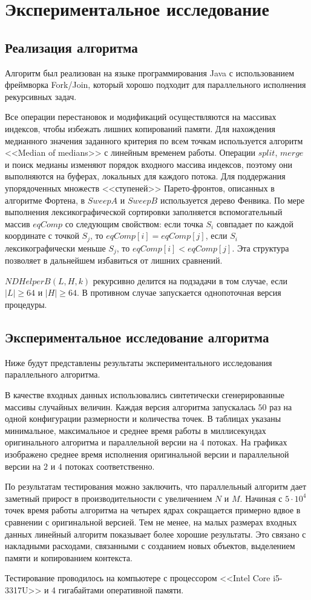 \chapter{Экспериментальное исследование}
\section{Реализация алгоритма}
Алгоритм был реализован на языке программирования Java с использованием фреймворка Fork/Join, который хорошо подходит для параллельного исполнения рекурсивных задач.

Все операции перестановок и модификаций осуществляются на массивах индексов, чтобы избежать лишних копирований памяти.
Для нахождения медианного значения заданного критерия по всем точкам используется алгоритм <<Median of medians>> с линейным временем работы.
Операции $split$, $merge$ и поиск медианы изменяют порядок входного массива индексов, поэтому они выполняются на буферах, локальных для каждого потока.
Для поддержания упорядоченных множеств <<ступеней>> Парето-фронтов, описанных в алгоритме Фортена, в $SweepA$ и $SweepB$ используется дерево Фенвика.
По мере выполнения лексикографической сортировки заполняется вспомогательный массив $eqComp$ со следующим свойством: если точка $S_i$ совпадает по каждой координате с точкой $S_j$, то $eqComp[i] = eqComp[j]$, если $S_i$ лексикографически меньше $S_j$, то $eqComp[i] < eqComp[j]$.
Эта структура позволяет в дальнейшем избавиться от лишних сравнений.

$NDHelperB(L, H, k)$ рекурсивно делится на подзадачи в том случае, если $|L|\geq 64$ и $|H|\geq 64$. В противном случае запускается однопоточная версия процедуры.  

\section{Экспериментальное исследование алгоритма}
Ниже будут представлены результаты экспериментального исследования параллельного алгоритма.

В качестве входных данных использовались синтетически сгенерированные массивы случайных величин.
Каждая версия алгоритма запускалась $50$ раз на одной конфигурации размерности и количества точек.
В таблицах указаны минимальное, максимальное и среднее время работы в миллисекундах оригинального алгоритма и параллельной версии на $4$ потоках.
На графиках изображено среднее время исполнения оригинальной версии и параллельной версии на $2$ и $4$ потоках соответственно.

По результатам тестирования можно заключить, что параллельный алгоритм дает заметный прирост в производительности с увеличением $N$ и $M$.
Начиная с $5\cdot 10^4$ точек время работы алгоритма на четырех ядрах сокращается примерно вдвое в сравнении с оригинальной версией.
Тем не менее, на малых размерах входных данных линейный алгоритм показывает более хорошие результаты.
Это связано с накладными расходами, связанными с созданием новых объектов, выделением памяти и копированием контекста.

Тестирование проводилось на компьютере с процессором <<Intel Core i5-3317U>> и 4 гигабайтами оперативной памяти.


